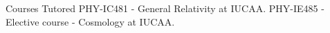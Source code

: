 \begin{rubric}{Courses Tutored}
\entry*[] PHY-IC481 - General Relativity at IUCAA.
%
\entry*[] PHY-IE485 - Elective course - Cosmology at IUCAA.
%

\end{rubric}